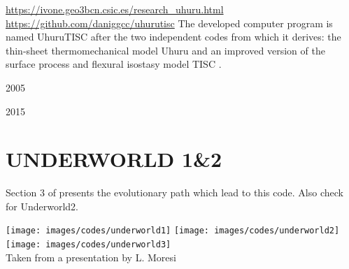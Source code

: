 \url{https://ivone.geo3bcn.csic.es/research_uhuru.html}
\url{https://github.com/daniggcc/uhurutisc}
The developed computer program is named UhuruTISC after the 
two independent codes from
which it derives: the thin-sheet thermomechanical model Uhuru \cite{jigf05} 
and an improved version
of the surface process and flexural isostasy model TISC \cite{garc02}.


2005 \textcite{jigf05}

2015 \textcite{gaji15}


\section{UNDERWORLD 1\&2} 
Section 3 of \cite{qums07} presents the evolutionary path which lead to this code.
Also check \cite{magm20} for Underworld2. 

\begin{center}
\texttt{[image: images/codes/underworld1]}
\texttt{[image: images/codes/underworld2]}
\texttt{[image: images/codes/underworld3]}\\
{\captionfont Taken from a presentation by L. Moresi}
\end{center}


